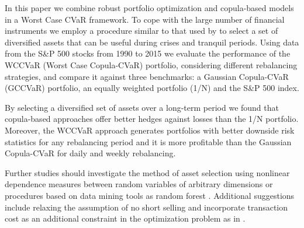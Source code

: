 \documentclass[a4paper,10pt]{article}
\begin{document}
In this paper we combine robust portfolio optimization and copula-based models in a Worst Case CVaR framework. To cope with the large number of financial instruments we employ a procedure similar to that used by \citet{ggr06} to select a set of diversified assets that can be useful during crises and tranquil periods. Using data from the S\&P 500 stocks from 1990 to 2015 we evaluate the performance of the WCCVaR (Worst Case Copula-CVaR) portfolio, considering different rebalancing strategies, and compare it against three benchmarks: a Gaussian Copula-CVaR (GCCVaR) portfolio, an equally weighted portfolio (1/N) and the S\&P 500 index. 

By selecting a diversified set of assets over a long-term period we found that copula-based approaches offer better hedges against losses than the 1/N portfolio. Moreover, the WCCVaR approach generates portfolios with better downside risk statistics for any rebalancing period and it is more profitable than the Gaussian Copula-CVaR for daily and weekly rebalancing.

Further studies should investigate the method of asset selection using nonlinear dependence measures between random variables of arbitrary dimensions \citep{lopez2013randomized} or procedures based on data mining tools as random forest \citep{dlrz10}. Additional suggestions include relaxing the assumption of no short selling and incorporate transaction cost as an additional constraint in the optimization problem as in \citet{krokhmal2002}.



\newpage
\end{document}
